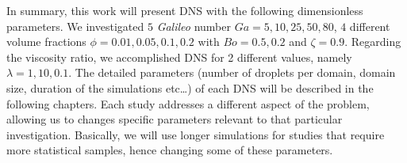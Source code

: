 In summary, this work will present DNS with the following dimensionless parameters. 
We investigated $5$ \textit{Galileo} number $Ga = 5,10,25,50,80$, $4$ different volume fractions $\phi = 0.01,0.05,0.1,0.2$ with $Bo = 0.5,0.2$ and $\zeta = 0.9$. %
Regarding the viscosity ratio, we accomplished DNS for 2 different values, namely $\lambda = 1,10,0.1$.
The detailed parameters (number of droplets per domain, domain size, duration of the simulations etc\ldots) of each DNS will be described in the following chapters. 
Each study addresses a different aspect of the problem, allowing us to changes specific parameters relevant to that particular investigation.
Basically, we will use longer simulations for studies that require more statistical samples, hence changing some of these parameters.